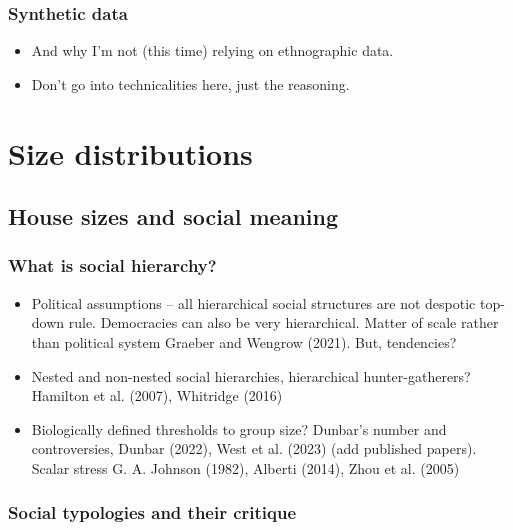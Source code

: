 \documentclass[
  12pt,
]{book}
\begin{document}
\hypertarget{synthetic-data}{%
\section{Synthetic data}\label{synthetic-data}}

\begin{itemize}
\item
  And why I'm not (this time) relying on ethnographic data.
\item
  Don't go into technicalities here, just the reasoning.
\end{itemize}

\hypertarget{part-size-distributions}{%
\part{Size distributions}\label{part-size-distributions}}

\hypertarget{house-sizes-and-social-meaning}{%
\chapter{House sizes and social meaning}\label{house-sizes-and-social-meaning}}

\hypertarget{what-is-social-hierarchy}{%
\section{What is social hierarchy?}\label{what-is-social-hierarchy}}

\begin{itemize}
\item
  Political assumptions -- all hierarchical social structures are not despotic top-down rule. Democracies can also be very hierarchical. Matter of scale rather than political system Graeber and Wengrow (2021). But, tendencies?
\item
  Nested and non-nested social hierarchies, hierarchical hunter-gatherers? Hamilton et al. (2007), Whitridge (2016)
\item
  Biologically defined thresholds to group size? Dunbar's number and controversies, Dunbar (2022), West et al. (2023) (add published papers). Scalar stress G. A. Johnson (1982), Alberti (2014), Zhou et al. (2005)
\end{itemize}

\hypertarget{social-typologies-and-their-critique}{%
\section{Social typologies and their critique}\label{social-typologies-and-their-critique}}
\end{document}
